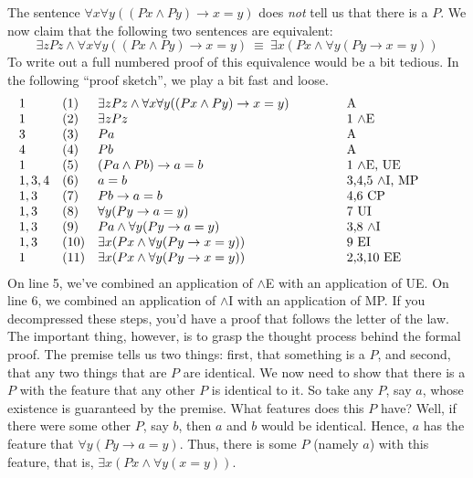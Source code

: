 The sentence $\forall x\forall y((Px\wedge Py)\to x=y)$ does {\it not}
tell us that there is a $P$.  We now claim that the following two
sentences are equivalent:
\[ \exists zPz\wedge \forall x\forall y((Px\wedge Py)\to
  x=y)\:\equiv\: \exists x(Px\wedge \forall y(Py\to x=y)) \]
To write out a full numbered proof of this equivalence would be a bit
tedious.  In the following ``proof sketch'', we play a bit fast and
loose.
\[ \begin{array}{l l >{$}p{6.5cm}<{$} p{3cm}} 1 & (1) & \exists zPz\wedge \forall
    x\forall y((Px\wedge Py)\to
                                         x=y) & A \\
     1 & (2) & \exists zPz & 1 $\wedge$E \\
     3 & (3) & Pa          & A  \\
     4 & (4) & Pb          & A  \\
     1 & (5) & (Pa\wedge Pb)\to a=b & 1 $\wedge$E, UE \\
     1,3,4 & (6) & a=b  & 3,4,5 $\wedge$I, MP \\
     1,3 & (7) & Pb\to a=b & 4,6 CP \\
     1,3 & (8) & \forall y(Py\to a=y) & 7 UI \\
     1,3 & (9) & Pa\wedge \forall y(Py\to a=y) & 3,8 $\wedge$I \\
     1,3 & (10) & \exists x(Px\wedge \forall y(Py\to x=y)) & 9 EI \\
     1 & (11) & \exists x(Px\wedge \forall y(Py\to x=y)) & 2,3,10
                                                           EE \end{array} \]
 On line 5, we've combined an application of $\wedge$E with an
 application of UE.  On line 6, we combined an application of
 $\wedge$I with an application of MP.  If you decompressed these steps,
 you'd have a proof that follows the letter of the law.  The important
 thing, however, is to grasp the thought process behind the formal
 proof.  The premise tells us two things: first, that something is a $P$,
 and second, that any two things that are $P$ are
 identical.  We now need to show
 that there is a $P$ with the feature that any other $P$ is identical
 to it.  So take any $P$, say $a$, whose existence is guaranteed by
 the premise.  What features does this $P$ have?  Well, if there were
 some other $P$, say $b$, then $a$ and $b$ would be identical.  Hence,
 $a$ has the feature that $\forall y(Py\to a=y)$.  Thus, there is some
 $P$ (namely $a$) with this feature, that is, $\exists x(Px\wedge
 \forall y(x=y))$.  


